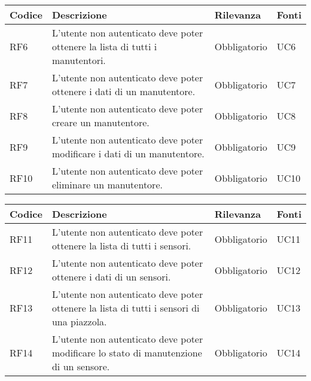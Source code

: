 \leavevmode\newline
\begin{table}
    \begin{tabular}{|p{1cm}|p{6cm}|p{1.9cm}|p{1cm}|} 
    \hline
    Codice & Descrizione & Rilevanza &  Fonti \\ 
    \hline
    RF6 & L'utente non autenticato deve poter ottenere la lista di tutti i manutentori. & Obbligatorio & UC6 \\ 
    \hline
    RF7 & L'utente non autenticato deve poter ottenere i dati di un manutentore. & Obbligatorio & UC7 \\ 
    \hline
    RF8 & L'utente non autenticato deve poter creare un manutentore. & Obbligatorio & UC8 \\ 
    \hline
    RF9 & L'utente non autenticato deve poter modificare i dati di un manutentore. & Obbligatorio & UC9 \\
    \hline
    RF10 & L'utente non autenticato deve poter eliminare un manutentore. & Obbligatorio & UC10 \\ 
    \hline
    \end{tabular}
\end{table}

\leavevmode\newline
\begin{table}
    \begin{tabular}{|p{1cm}|p{6cm}|p{1.9cm}|p{1cm}|} 
    \hline
    Codice & Descrizione & Rilevanza &  Fonti \\ 
    \hline
    RF11 & L'utente non autenticato deve poter ottenere la lista di tutti i sensori. & Obbligatorio & UC11 \\ 
    \hline
    RF12 & L'utente non autenticato deve poter ottenere i dati di un sensori. & Obbligatorio & UC12 \\ 
    \hline
    RF13 & L'utente non autenticato deve poter ottenere la lista di tutti i sensori di una piazzola. & Obbligatorio & UC13 \\ 
    \hline
    RF14 & L'utente non autenticato deve poter modificare lo stato di manutenzione di un sensore. & Obbligatorio & UC14 \\ 
    \hline
    \end{tabular}
\end{table}

